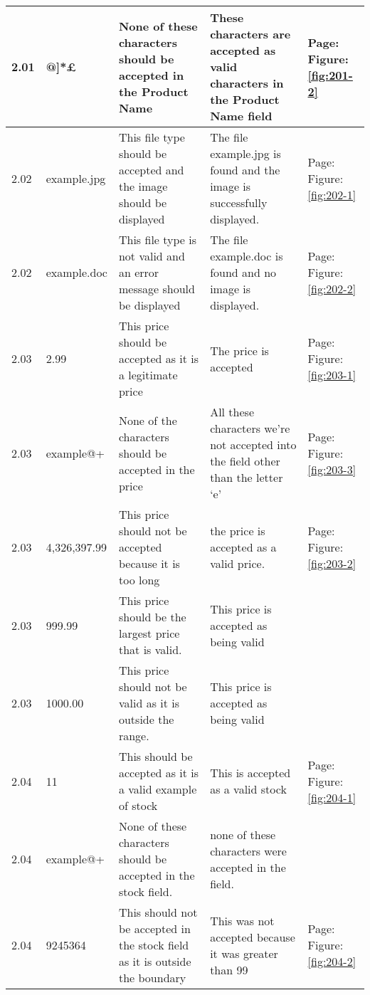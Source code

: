 \begin{flushleft}
\begin{longtable}{|p{1.0cm}|p{2.5cm}|p{3cm}|p{3.0cm}|p{2.5cm}|}
	2.01 &  @]*£  & None of these characters should be accepted in the Product Name & These characters are accepted as valid characters in the Product Name field& Page:\pageref{fig:201-2}  \newline Figure:\ref{fig:201-2}\\ \hline 
	2.02 & example.jpg & This file type should be accepted and the image should be displayed & The file example.jpg is found and the image is successfully displayed. & Page:\pageref{fig:202-1}  \newline Figure:\ref{fig:202-1} \\ \hline
	2.02 & example.doc & This file type is not valid and an error message should be displayed & The file example.doc is found and no image is displayed. & Page:\pageref{fig:202-2}  \newline Figure:\ref{fig:202-2}\\ \hline
	2.03 & 2.99 & This price should be accepted as it is a legitimate price & The price is accepted & Page:\pageref{fig:203-1}  \newline Figure:\ref{fig:203-1}\\ \hline
	2.03 &  example@+ & None of the characters should be accepted in the price & All these characters we're not accepted into the field other than the letter `e' & Page:\pageref{fig:203-3}  \newline Figure:\ref{fig:203-3}\\ \hline
	2.03 & 4,326,397.99 & This price should not be accepted because it is too long& the price is accepted as a valid price. & Page:\pageref{fig:203-2}  \newline Figure:\ref{fig:203-2}\\ \hline
	2.03 & 999.99 & This price should be the largest price that is valid.& This price is accepted as being valid & \\ \hline
	2.03 & 1000.00 & This price should not be valid as it is outside the range.& This price is accepted as being valid & \\ \hline
	2.04 &  11  & This should be accepted as it is a valid example of stock & This is accepted as a valid stock & Page:\pageref{fig:204-1}  \newline Figure:\ref{fig:204-1} \\ \hline
	2.04 &  example@+ & None of these characters should be accepted in the stock field. & none of these characters were accepted in the field.  & \\ \hline
	2.04 &  9245364 & This should not be accepted in the stock field as it is outside the boundary& This was not accepted because it was greater than 99 & Page:\pageref{fig:204-2}  \newline Figure:\ref{fig:204-2} \\ \hline

\end{longtable}
\end{flushleft}
